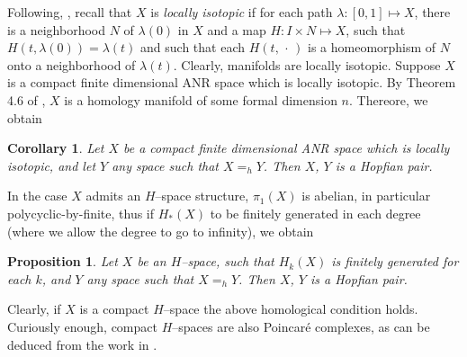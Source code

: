 \documentclass[reqno,12pt]{amsart}
\newtheorem{corollary}[theorem]{Corollary}
\newtheorem{proposition}[theorem]{Proposition}
\theoremstyle{ourremark}
\numberwithin{equation}{section}
\numberwithin{theorem}{section}
\begin{document}
Following, \cite{Bredon70}, recall that  $X$ is {\em locally isotopic} if for each path $\lambda:[0,1]\longmapsto X$, there is a neighborhood $N$ of $\lambda(0)$ in $X$ and a map $H:I\times N\longmapsto X$, such that $H(t,\lambda(0))=\lambda(t)$ and such that each $H(t,\,\cdot\,)$ is a homeomorphism of $N$ onto a neighborhood of $\lambda(t)$. Clearly, manifolds are locally isotopic. Suppose $X$ is a compact finite dimensional ANR space which is locally isotopic. By Theorem 4.6 of \cite{Bredon70}, $X$ is a homology manifold of some formal dimension  $n$. Thereore, we obtain
\begin{corollary}
Let $X$ be a compact finite dimensional ANR space which is locally isotopic, and let $Y$ any space such that $X=_h Y$. Then $X$, $Y$ is a Hopfian pair.
\end{corollary}

{\noindent} In the case $X$ admits an $H$--space structure, $\pi_1(X)$ is abelian, in particular polycyclic-by-finite, thus if  $H_\ast(X)$ to be finitely generated in each degree (where we allow the degree to go to infinity), we obtain 
\begin{proposition}
 Let $X$ be an $H$--space, such that $H_k(X)$ is finitely generated for each $k$, and $Y$ any space such that $X=_h Y$. Then $X$, $Y$ is a Hopfian pair.
\end{proposition}
{\noindent} Clearly,  if $X$ is a compact $H$--space the above homological condition holds. Curiously enough, compact $H$--spaces are also Poincar\'e complexes, as can be deduced from the work in \cite{Bauer-et.al04}.
\end{document}
